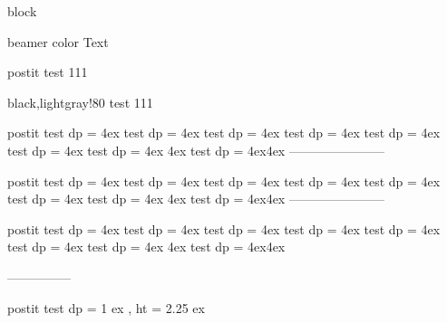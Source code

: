 \documentclass[9pt,blue,xcolor=pdftex,dvipsnames,table,handout,notes]{beamer}
\begin{document}
\begin{frame}{block}


\begin{beamercolorbox}{beamer color}
Text
\end{beamercolorbox}


\begin{beamercolorbox}[	wd=8em, 
						sep=1em, 		%
						left]{postit}
	test 111
\end{beamercolorbox}

\begin{beamercolorbox}[	wd=8em, 
						sep=1em, 		%
						left]{black,lightgray!80}
	test 111
\end{beamercolorbox}


\begin{beamercolorbox}[	wd=30em,
						colsep=4em,	%
						leftskip=16em,
						rightskip=16em,
						left]{postit}
test dp = 4ex test dp = 4ex test dp = 4ex test dp = 4ex test dp = 4ex test dp = 4ex test dp = 4ex
4ex test dp = 4ex4ex
-----------------------
\end{beamercolorbox}


\begin{beamercolorbox}[	wd=30em,
						sep=1em, 		%
						leftskip=16em,
						rightskip=16em,
						left, 
						rounded=true]{postit}
test dp = 4ex test dp = 4ex test dp = 4ex test dp = 4ex test dp = 4ex test dp = 4ex test dp = 4ex
4ex test dp = 4ex4ex
-----------------------
\end{beamercolorbox}



\begin{beamercolorbox}[	wd=30em,
						ht=18.0ex, 
						colsep=2em,	%
						leftskip=1em,
						rightskip=1em,
						left, 
						rounded=true]{postit}
test dp = 4ex test dp = 4ex test dp = 4ex test dp = 4ex test dp = 4ex test dp = 4ex test dp = 4ex
4ex test dp = 4ex4ex
\end{beamercolorbox}


---------------
\begin{beamercolorbox}[dp=1ex, ht=2.25ex, left]{postit}
test dp = 1 ex , ht = 2.25 ex
\end{beamercolorbox}


\end{frame}
\end{document}
